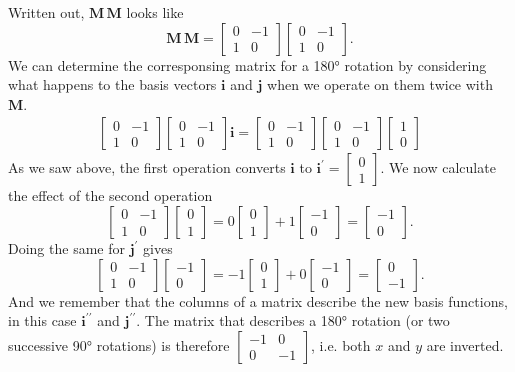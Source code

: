 \documentclass[a4paper]{article}
\newcommand{\bvec}[1]{\mathbf{#1}}
\newcommand{\cvec}[2]{\begin{bmatrix}#1\\#2\end{bmatrix}}
\begin{document}
Written out, $\bvec{M}\,\bvec{M}$ looks like
\begin{equation*}
\bvec{M}\,\bvec{M}= \begin{bmatrix}0 & -1\\ 1 & 0\end{bmatrix}\begin{bmatrix}0 & -1\\ 1 & 0\end{bmatrix}.
\end{equation*}
We can determine the corresponsing matrix for a \ang{180} rotation by considering what happens to the basis vectors $\bvec{i}$ and $\bvec{j}$ when we operate on them twice with $\bvec{M}$.
\begin{eqnarray*}
\begin{bmatrix}0 & -1\\ 1 & 0\end{bmatrix}\begin{bmatrix}0 & -1\\ 1 & 0\end{bmatrix}\bvec{i} = \begin{bmatrix}0 & -1\\ 1 & 0\end{bmatrix}\begin{bmatrix}0 & -1\\ 1 & 0\end{bmatrix}\cvec{1}{0}
\end{eqnarray*}
As we saw above, the first operation converts $\bvec{i}$ to $\bvec{i^\prime}=\cvec{0}{1}$. We now calculate the effect of the second operation
\begin{equation}
\begin{bmatrix}0 & -1\\ 1 & 0\end{bmatrix}\cvec{0}{1} = 0\cvec{0}{1} + 1\cvec{-1}{0} = \cvec{-1}{0}.
\end{equation}
Doing the same for $\bvec{j^\prime}$ gives
\begin{equation}
\begin{bmatrix}0 & -1\\ 1 & 0\end{bmatrix}\cvec{-1}{0} = -1\cvec{0}{1} + 0\cvec{-1}{0} = \cvec{0}{-1}.
\end{equation}
And we remember that the columns of a matrix describe the new basis functions, in this case $\bvec{i^{\prime\prime}}$ and $\bvec{j^{\prime\prime}}$. The matrix that describes a \ang{180} rotation (or two successive \ang{90} rotations) is therefore $\begin{bmatrix}-1 & 0\\ 0 & -1\end{bmatrix}$, i.e. both $x$ and $y$ are inverted.
\end{document}
